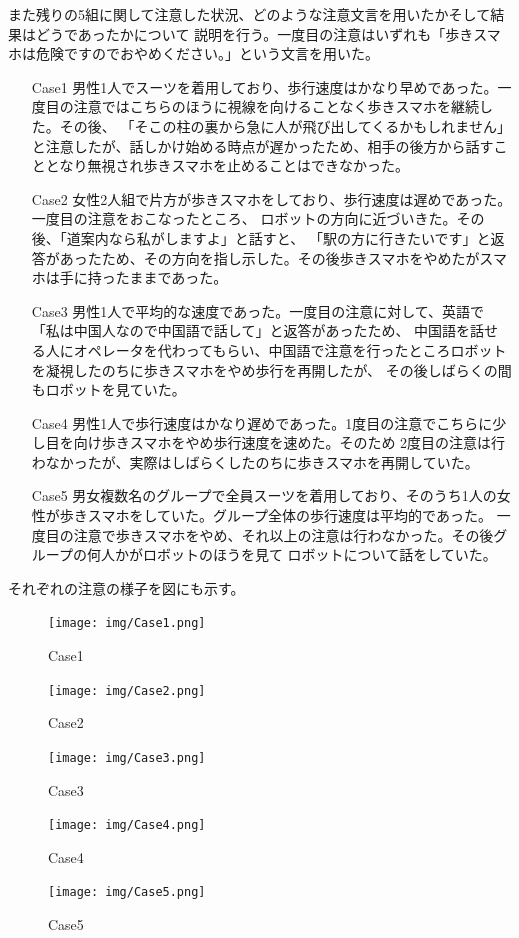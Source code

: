 \documentclass{kuisthesis}
\begin{document}
また残りの5組に関して注意した状況、どのような注意文言を用いたかそして結果はどうであったかについて
説明を行う。一度目の注意はいずれも「歩きスマホは危険ですのでおやめください。」という文言を用いた。
\begin{enumerate}
  \item[Case1] 男性1人でスーツを着用しており、歩行速度はかなり早めであった。一度目の注意ではこちらのほうに視線を向けることなく歩きスマホを継続した。その後、
  「そこの柱の裏から急に人が飛び出してくるかもしれません」
  と注意したが、話しかけ始める時点が遅かったため、相手の後方から話すこととなり無視され歩きスマホを止めることはできなかった。
  \item[Case2] 女性2人組で片方が歩きスマホをしており、歩行速度は遅めであった。一度目の注意をおこなったところ、
  ロボットの方向に近づいきた。その後、「道案内なら私がしますよ」と話すと、
  「駅の方に行きたいです」と返答があったため、その方向を指し示した。その後歩きスマホをやめたがスマホは手に持ったままであった。
  \item[Case3] 男性1人で平均的な速度であった。一度目の注意に対して、英語で「私は中国人なので中国語で話して」と返答があったため、
  中国語を話せる人にオペレータを代わってもらい、中国語で注意を行ったところロボットを凝視したのちに歩きスマホをやめ歩行を再開したが、
  その後しばらくの間もロボットを見ていた。
  \item[Case4] 男性1人で歩行速度はかなり遅めであった。1度目の注意でこちらに少し目を向け歩きスマホをやめ歩行速度を速めた。そのため
  2度目の注意は行わなかったが、実際はしばらくしたのちに歩きスマホを再開していた。
  \item[Case5] 男女複数名のグループで全員スーツを着用しており、そのうち1人の女性が歩きスマホをしていた。グループ全体の歩行速度は平均的であった。
  一度目の注意で歩きスマホをやめ、それ以上の注意は行わなかった。その後グループの何人かがロボットのほうを見て
  ロボットについて話をしていた。
\end{enumerate}
それぞれの注意の様子を図にも示す。
\begin{figure}[H]
  \centering
  \texttt{[image: img/Case1.png]}
  \caption{Case1}
  \label{fig: Case1}
\end{figure}
\begin{figure}[H]
  \centering
  \texttt{[image: img/Case2.png]}
  \caption{Case2}
  \label{fig: Case2}
\end{figure}
\begin{figure}[H]
  \centering
  \texttt{[image: img/Case3.png]}
  \caption{Case3}
  \label{fig: Case3}
\end{figure}
\begin{figure}[H]
  \centering
  \texttt{[image: img/Case4.png]}
  \caption{Case4}
  \label{fig: Case4}
\end{figure}
\begin{figure}[H]
  \centering
  \texttt{[image: img/Case5.png]}
  \caption{Case5}
  \label{fig: Case5}
\end{figure}
\end{document}
